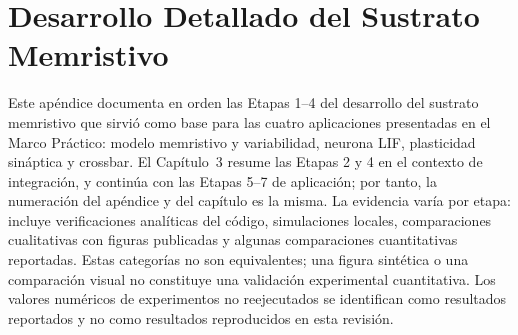 \chapter{Desarrollo Detallado del Sustrato Memristivo}
\label{ap:desarrollo_extendido}

Este apéndice documenta en orden las Etapas 1--4 del desarrollo del
sustrato memristivo que sirvió como base para las cuatro aplicaciones
presentadas en el Marco Práctico: modelo memristivo y variabilidad,
neurona LIF, plasticidad sináptica y crossbar. El Capítulo~3 resume
las Etapas 2 y 4 en el contexto de integración, y continúa con las
Etapas 5--7 de aplicación; por tanto, la numeración del apéndice y del
capítulo es la misma. La evidencia varía por etapa: incluye verificaciones
analíticas del código, simulaciones locales, comparaciones
cualitativas con figuras publicadas y algunas comparaciones
cuantitativas reportadas. Estas categorías no son equivalentes; una
figura sintética o una comparación visual no constituye una
validación experimental cuantitativa. Los valores numéricos de
experimentos no reejecutados se identifican como resultados
reportados y no como resultados reproducidos en esta revisión.





